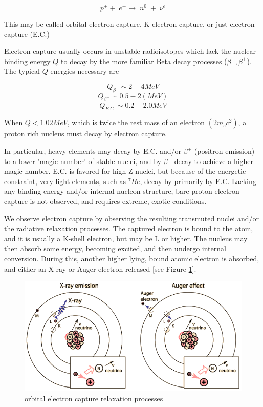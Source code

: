 \documentclass[%
 aip,
 jmp,%
 amsmath,amssymb,
 reprint,%
]{revtex4-1}
\begin{document}
$$p^{+}+\;e^{-}\rightarrow\;n^{0}\;+\;\nu^{e}$$

This may be called orbital electron capture, K-electron capture, or just electron capture (E.C.) 

Electron capture usually occurs in unstable radioisotopes which lack the nuclear binding energy $Q$ to decay by the more familiar Beta decay processes ($\beta^{-}, \beta^{+}$). The typical $Q$ energies necessary are 

$$Q_{\beta^{+}}\sim2-4{MeV}$$
$$Q_{\beta^{-}}\sim0.5-2(MeV)$$
$$Q_{E.C.}\sim0.2-2.0{MeV}$$

When $Q<1.02{MeV}$, which is twice the rest mass of an electron $(2m_{e}c^{2})$, a proton rich nucleus must decay by electron capture. 

In particular, heavy elements may decay by E.C. and/or $\beta^{+}$ (positron emission) to a lower 'magic number' of stable nuclei, and by $\beta^{-}$ decay to achieve a higher magic number.    E.C. is favored for high Z nuclei, but because of the energetic constraint, very light elements, such as $^{7}Be$, decay by primarily by E.C.    Lacking any binding energy and/or internal nucleon structure, bare proton electron capture is not observed, and requires extreme, exotic conditions.
 
We observe electron capture by observing the resulting transmuted nuclei and/or the radiative relaxation processes.  The captured electron is bound to the atom, and it is usually a K-shell electron, but may be L or higher.  The nucleus may then absorb some energy, becoming excited, and then undergo internal conversion.  During this, another higher lying, bound atomic electron is absorbed, and either an X-ray or Auger electron released [see Figure \ref{fig:ec1}].

\begin{figure}
   \includegraphics[scale=0.25]{img/ecrelax.png}
   \caption{orbital electron capture relaxation processes}
  \label{fig:ec1}
\end{figure}
\end{document}
